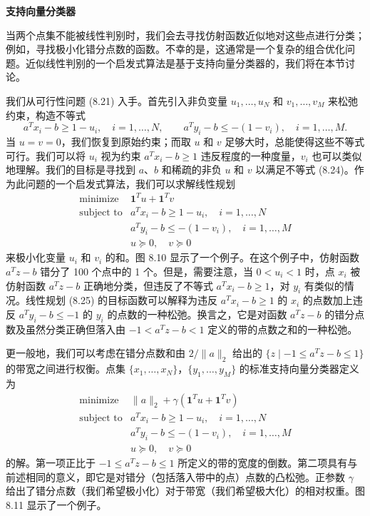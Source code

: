 \documentclass[UTF8,12pt,a4paper,fontset=fandol]{ctexart}
\begin{document}
\noindent\textbf{支持向量分类器}

当两个点集不能被线性判别时，我们会去寻找仿射函数近似地对这些点进行分类；例如，寻找极小化错分点数的函数。不幸的是，这通常是一个复杂的组合优化问题。近似线性判别的一个启发式算法是基于支持向量分类器的，我们将在本节讨论。

我们从可行性问题 (8.21) 入手。首先引入非负变量 $u_1,\ldots,u_N$ 和 $v_1,\ldots,v_M$ 来松弛约束，构造不等式
\[
a^Tx_i-b\geq 1-u_i,\quad i=1,\ldots,N,\qquad
a^Ty_i-b\leq -(1-v_i),\quad i=1,\ldots,M.
\tag{8.24}
\]
当 $u=v=0$，我们恢复到原始约束；而取 $u$ 和 $v$ 足够大时，总能使得这些不等式可行。我们可以将 $u_i$ 视为约束 $a^Tx_i-b\geq 1$ 违反程度的一种度量，$v_i$ 也可以类似地理解。我们的目标是寻找到 $a$、$b$ 和稀疏的非负 $u$ 和 $v$ 以满足不等式 (8.24)。作为此问题的一个启发式算法，我们可以求解线性规划
\[
\begin{array}{ll}
\mbox{minimize} & \mathbf{1}^Tu+\mathbf{1}^Tv\\
\mbox{subject to} & a^Tx_i-b\geq 1-u_i,\quad i=1,\ldots,N\\
& a^Ty_i-b\leq -(1-v_i),\quad i=1,\ldots,M\\
& u\succeq 0,\quad v\succeq 0
\end{array}
\tag{8.25}
\]
来极小化变量 $u_i$ 和 $v_i$ 的和。图 8.10 显示了一个例子。在这个例子中，仿射函数 $a^Tz-b$ 错分了 100 个点中的 1 个。但是，需要注意，当 $0<u_i<1$ 时，点 $x_i$ 被仿射函数
$a^Tz-b$ 正确地分类，但违反了不等式 $a^Tx_i-b\geq 1$，对 $y_i$ 有类似的情况。线性规划 (8.25) 的目标函数可以解释为违反 $a^Tx_i-b\geq 1$ 的 $x_i$ 的点数加上违反 $a^Ty_i-b\leq -1$ 的 $y_i$ 的点数的一种松弛。换言之，它是对函数 $a^Tz-b$ 的错分点数及虽然分类正确但落入由 $-1<a^Tz-b<1$ 定义的带的点数之和的一种松弛。

更一般地，我们可以考虑在错分点数和由 $2/\|a\|_2$ 给出的 $\{z\mid -1\leq a^Tz-b\leq 1\}$ 的带宽之间进行权衡。点集 $\{x_1,\ldots,x_N\}$，$\{y_1,\ldots,y_M\}$ 的标准支持向量分类器定义为
\[
\begin{array}{ll}
\mbox{minimize} & \|a\|_2+\gamma(\mathbf{1}^Tu+\mathbf{1}^Tv)\\
\mbox{subject to} & a^Tx_i-b\geq 1-u_i,\quad i=1,\ldots,N\\
& a^Ty_i-b\leq -(1-v_i),\quad i=1,\ldots,M\\
& u\succeq 0,\quad v\succeq 0
\end{array}
\]
的解。第一项正比于 $-1\leq a^Tz-b\leq 1$ 所定义的带的宽度的倒数。第二项具有与前述相同的意义，即它是对错分（包括落入带中的点）点数的凸松弛。正参数 $\gamma$ 给出了错分点数（我们希望极小化）对于带宽（我们希望极大化）的相对权重。图 8.11 显示了一个例子。
\end{document}
